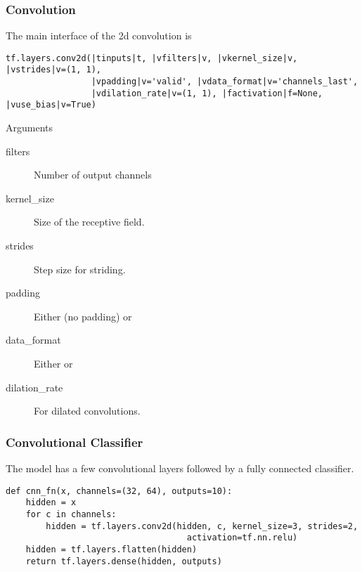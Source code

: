 \begin{frame}[fragile]
    \frametitle{Convolution}
    The main interface of the 2d convolution is
    \begin{lstlisting}
tf.layers.conv2d(|tinputs|t, |vfilters|v, |vkernel_size|v, |vstrides|v=(1, 1), 
                 |vpadding|v='valid', |vdata_format|v='channels_last',
                 |vdilation_rate|v=(1, 1), |factivation|f=None, |vuse_bias|v=True)
    \end{lstlisting}
    \begin{block}{Arguments}
        \begin{description}
        \item[filters] Number of output channels
        \item[kernel\_size] Size of the receptive field.
        \item[strides] Step size for striding.
        \item[padding] Either  (no padding) or 
        \item[data\_format] Either  or 
        \item[dilation\_rate] For dilated convolutions.
        \end{description}
    \end{block}
\end{frame}

\begin{frame}[fragile]
    \frametitle{Convolutional Classifier}
    The model has a few convolutional layers followed by a fully connected classifier.
    \begin{lstlisting}
def cnn_fn(x, channels=(32, 64), outputs=10):
    hidden = x
    for c in channels:
        hidden = tf.layers.conv2d(hidden, c, kernel_size=3, strides=2,
                                    activation=tf.nn.relu)
    hidden = tf.layers.flatten(hidden)
    return tf.layers.dense(hidden, outputs)
    \end{lstlisting}
\end{frame}

